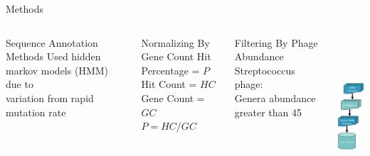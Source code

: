 \documentclass[11pt, xcolor=table]{beamer}
\begin{document}
	\begin{frame}{Methods}
	\begin{columns}
	\begin{block}{Sequence Annotation Methods}
	Used hidden markov models (HMM) due to \\variation from rapid mutation rate
	\end{block}
	
	\begin{block}{Normalizing By Gene Count}
	Hit Percentage = $P$ \\
	Hit Count = $HC$ \\
	Gene Count = $GC$ \\
	\vspace{0.3cm}
	\hspace{1.5cm}	
	$P = {HC}/{GC}$
	\end{block}
	
	\begin{block}{Filtering By Phage Abundance}
	\alert{Streptococcus} phage: \\
	Genera abundance greater than 45
	\end{block}
	
	\hspace{-2cm}
	\includegraphics[height=6cm, width=3cm]{Pipeline.png}

	\end{columns}
	\end{frame}
	
\end{document}
